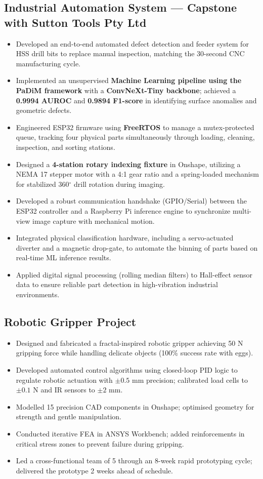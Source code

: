 \documentclass[11pt,a4paper]{article}
\begin{document}
\subsection{Industrial Automation System --- Capstone with Sutton Tools Pty Ltd}
\begin{itemize}
    \item Developed an end-to-end automated defect detection and feeder system for HSS drill bits to replace manual inspection, matching the 30-second CNC manufacturing cycle.
    \item Implemented an unsupervised \textbf{Machine Learning pipeline using the PaDiM framework} with a \textbf{ConvNeXt-Tiny backbone}; achieved a \textbf{0.9994 AUROC} and \textbf{0.9894 F1-score} in identifying surface anomalies and geometric defects.
    \item Engineered ESP32 firmware using \textbf{FreeRTOS} to manage a mutex-protected queue, tracking four physical parts simultaneously through loading, cleaning, inspection, and sorting stations.
    \item Designed a \textbf{4-station rotary indexing fixture} in Onshape, utilizing a NEMA 17 stepper motor with a 4:1 gear ratio and a spring-loaded mechanism for stabilized 360$^\circ$ drill rotation during imaging.
    \item Developed a robust communication handshake (GPIO/Serial) between the ESP32 controller and a Raspberry Pi inference engine to synchronize multi-view image capture with mechanical motion.
    \item Integrated physical classification hardware, including a servo-actuated diverter and a magnetic drop-gate, to automate the binning of parts based on real-time ML inference results.
    \item Applied digital signal processing (rolling median filters) to Hall-effect sensor data to ensure reliable part detection in high-vibration industrial environments.
\end{itemize}

\subsection{Robotic Gripper Project}
\begin{itemize}
    \item Designed and fabricated a fractal-inspired robotic gripper achieving 50 N gripping force while handling delicate objects (100\% success rate with eggs).
    \item Developed automated control algorithms using closed-loop PID logic to regulate robotic actuation with $\pm 0.5$ mm precision; calibrated load cells to $\pm 0.1$ N and IR sensors to $\pm 2$ mm.
    \item Modelled 15 precision CAD components in Onshape; optimised geometry for strength and gentle manipulation.
    \item Conducted iterative FEA in ANSYS Workbench; added reinforcements in critical stress zones to prevent failure during gripping.
    \item Led a cross-functional team of 5 through an 8-week rapid prototyping cycle; delivered the prototype 2 weeks ahead of schedule.
\end{itemize}
\end{document}
